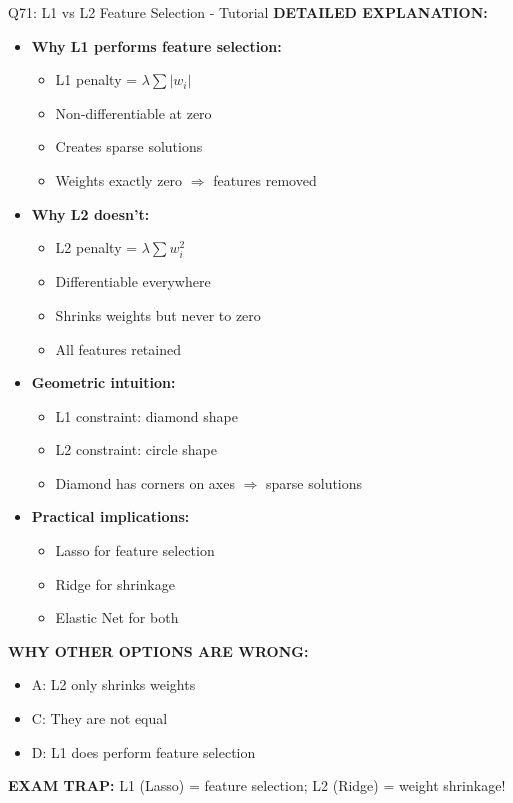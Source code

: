 \documentclass[8pt]{beamer}
\begin{document}
\begin{frame}{Q71: L1 vs L2 Feature Selection - Tutorial}
		\vspace{0.05cm}
		\textbf{DETAILED EXPLANATION:}
		\begin{itemize}
			\item \textbf{Why L1 performs feature selection:}
			\begin{itemize}
				\item L1 penalty = $\lambda \sum |w_i|$
				\item Non-differentiable at zero
				\item Creates sparse solutions
				\item Weights exactly zero $\Rightarrow$ features removed
			\end{itemize}
			\item \textbf{Why L2 doesn't:}
			\begin{itemize}
				\item L2 penalty = $\lambda \sum w_i^2$
				\item Differentiable everywhere
				\item Shrinks weights but never to zero
				\item All features retained
			\end{itemize}
			\item \textbf{Geometric intuition:}
			\begin{itemize}
				\item L1 constraint: diamond shape
				\item L2 constraint: circle shape
				\item Diamond has corners on axes $\Rightarrow$ sparse solutions
			\end{itemize}
			\item \textbf{Practical implications:}
			\begin{itemize}
				\item Lasso for feature selection
				\item Ridge for shrinkage
				\item Elastic Net for both
			\end{itemize}
		\end{itemize}
		
		\vspace{0.05cm}
		\textcolor{myred}{\textbf{WHY OTHER OPTIONS ARE WRONG:}}
		\begin{itemize}
			\item \textcolor{myred}{A:} L2 only shrinks weights
			\item \textcolor{myred}{C:} They are not equal
			\item \textcolor{myred}{D:} L1 does perform feature selection
		\end{itemize}
		
		\textcolor{myred}{\textbf{EXAM TRAP:}} L1 (Lasso) = feature selection; L2 (Ridge) = weight shrinkage!
	\end{frame}
	
\end{document}
